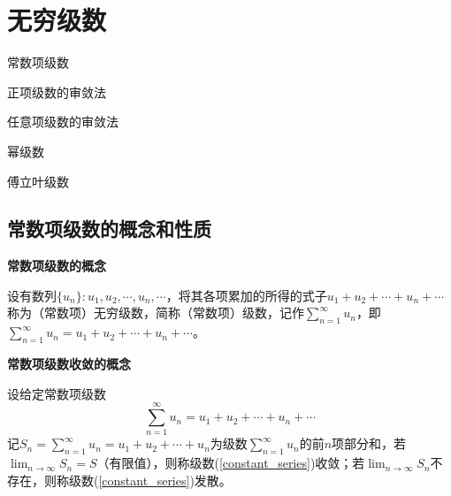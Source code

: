 \setcounter{chapter}{10}

\chapter{无穷级数}

\begin{introduction}
    \item 常数项级数
    \item 正项级数的审敛法
    \item 任意项级数的审敛法
    \item 幂级数
    \item 傅立叶级数
\end{introduction}

\section{常数项级数的概念和性质}

\textbf{常数项级数的概念}

设有数列$\{u_n\}:u_1,u_2,\cdots,u_n,\cdots$，将其各项累加的所得的式子$u_1+u_2+\cdots+u_n+\cdots$称为（常数项）无穷级数，简称（常数项）级数，记作$\displaystyle\sum_{n=1}^\infty u_n$，即$\displaystyle\sum_{n=1}^\infty u_n=u_1+u_2+\cdots+u_n+\cdots$。

\textbf{常数项级数收敛的概念}

设给定常数项级数
\begin{equation}
    \sum_{n=1}^\infty u_n=u_1+u_2+\cdots+u_n+\cdots
    \label{constant_series}
\end{equation}
记$S_n=\displaystyle\sum_{n=1}^\infty u_n=u_1+u_2+\cdots+u_n$为级数$\sum_{n=1}^\infty u_n$的前$n$项部分和，若$\displaystyle\lim_{n\rightarrow\infty}S_n=S$（有限值），则称级数(\ref{constant_series})收敛；若$\displaystyle\lim_{n\rightarrow\infty}S_n$不存在，则称级数(\ref{constant_series})发散。

